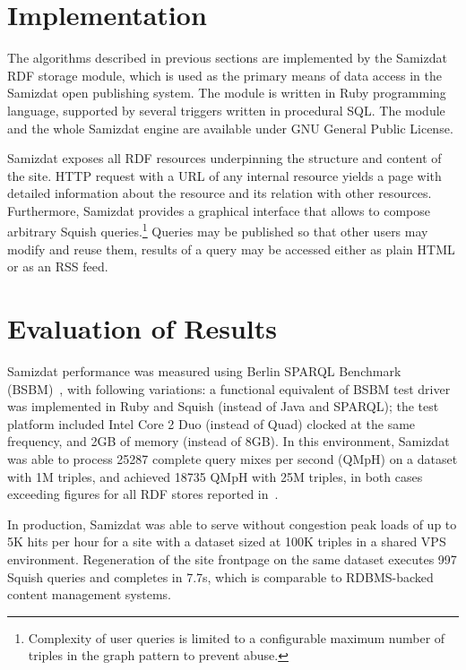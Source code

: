 \documentclass[conference,letterpaper]{IEEEtran}
\begin{document}
\section{Implementation}

The algorithms described in previous sections are implemented by the
Samizdat RDF storage module, which is used as the primary means of data
access in the Samizdat open publishing system. The module is written in
Ruby programming language, supported by several triggers written in
procedural SQL. The module and the whole Samizdat engine are available
under GNU General Public License.

Samizdat exposes all RDF resources underpinning the structure and
content of the site. HTTP request with a URL of any internal resource
yields a page with detailed information about the resource and its
relation with other resources. Furthermore, Samizdat provides a
graphical interface that allows to compose arbitrary Squish
queries.\footnote{Complexity of user queries is limited to a
configurable maximum number of triples in the graph pattern to prevent
abuse.} Queries may be published so that other users may modify and
reuse them, results of a query may be accessed either as plain HTML or
as an RSS feed.


\section{Evaluation of Results}
\label{evaluation}


Samizdat performance was measured using Berlin SPARQL Benchmark
(BSBM)~\cite{bsbm}, with following variations: a functional equivalent
of BSBM test driver was implemented in Ruby and Squish (instead of Java
and SPARQL); the test platform included Intel Core 2 Duo (instead of
Quad) clocked at the same frequency, and 2GB of memory (instead of 8GB).
In this environment, Samizdat was able to process 25287 complete query
mixes per second (QMpH) on a dataset with 1M triples, and achieved 18735
QMpH with 25M triples, in both cases exceeding figures for all RDF
stores reported in~\cite{bsbm}.

In production, Samizdat was able to serve without congestion peak loads
of up to 5K hits per hour for a site with a dataset sized at 100K
triples in a shared VPS environment. Regeneration of the site frontpage
on the same dataset executes 997 Squish queries and completes in 7.7s,
which is comparable to RDBMS-backed content management systems.
\end{document}
